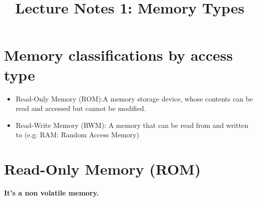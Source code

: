 \documentclass[12 pt]{article}
\title{\huge{Lecture Notes 1: Memory Types}}
\author{}
\date{}
\begin{document}
\maketitle
\tableofcontents
\newpage
\section{Memory classifications by access type}
\begin{itemize}
    \item Read-Only Memory (ROM):A memory storage device, whose contents can be read and accessed but cannot be modified.
    \item Read-Write Memory (RWM): A memory that can be read from and written to (e.g: RAM: Random Access Memory)
\end{itemize}
\section{Read-Only Memory (ROM)} 
\textbf{It's a non volatile memory.}
\end{document}
